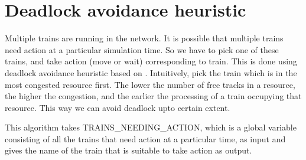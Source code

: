 \section{Deadlock avoidance heuristic}
Multiple trains are running in the network. It is possible that multiple trains need action at a particular simulation time.
So we have to pick one of these trains, and take action (move or wait) corresponding to 
train. This is done using deadlock avoidance heuristic based on \cite{ARTICLE:2}.
Intuitively, pick the train which is in the most
congested resource first. The lower the number of free tracks
in a resource, the higher the congestion, and the earlier the
processing of a train occupying that resource. This way we can avoid deadlock upto certain extent.

\vspace{0.25cm}
This algorithm takes TRAINS\_NEEDING\_ACTION, which is a global variable consisting of all the trains
that need action at a particular time, as input and gives the name of the train that is suitable to 
take action as output. 

